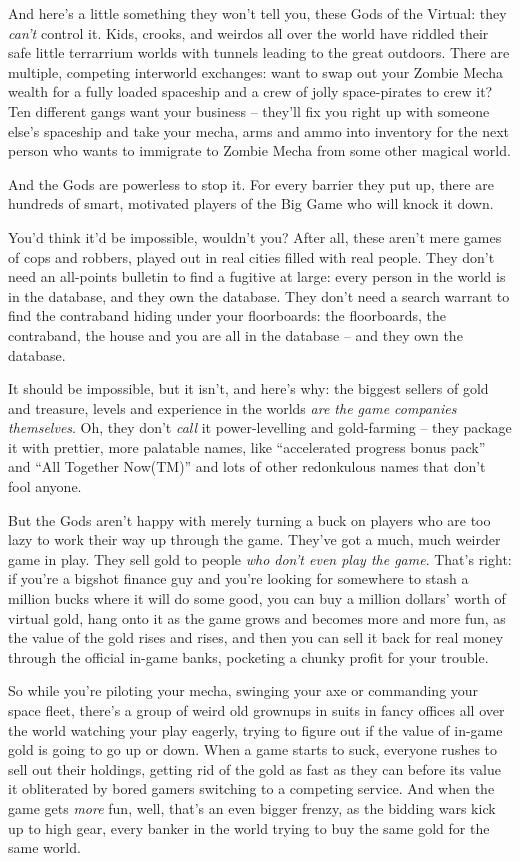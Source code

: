 And here's a little something they won't tell you, these Gods of
the Virtual: they \emph{can't} control it. Kids, crooks, and
weirdos all over the world have riddled their safe little
terrarrium worlds with tunnels leading to the great outdoors. There
are multiple, competing interworld exchanges: want to swap out your
Zombie Mecha wealth for a fully loaded spaceship and a crew of
jolly space-pirates to crew it? Ten different gangs want your
business -- they'll fix you right up with someone else's spaceship
and take your mecha, arms and ammo into inventory for the next
person who wants to immigrate to Zombie Mecha from some other
magical world.

And the Gods are powerless to stop it. For every barrier they put
up, there are hundreds of smart, motivated players of the Big Game
who will knock it down.

You'd think it'd be impossible, wouldn't you? After all, these
aren't mere games of cops and robbers, played out in real cities
filled with real people. They don't need an all-points bulletin to
find a fugitive at large: every person in the world is in the
database, and they own the database. They don't need a search
warrant to find the contraband hiding under your floorboards: the
floorboards, the contraband, the house and you are all in the
database -- and they own the database.

It should be impossible, but it isn't, and here's why: the biggest
sellers of gold and treasure, levels and experience in the worlds
\emph{are the game companies themselves}. Oh, they don't
\emph{call} it power-levelling and gold-farming -- they package it
with prettier, more palatable names, like ``accelerated progress
bonus pack'' and ``All Together Now(TM)'' and lots of other
redonkulous names that don't fool anyone.

But the Gods aren't happy with merely turning a buck on players who
are too lazy to work their way up through the game. They've got a
much, much weirder game in play. They sell gold to people
\emph{who don't even play the game}. That's right: if you're a
bigshot finance guy and you're looking for somewhere to stash a
million bucks where it will do some good, you can buy a million
dollars' worth of virtual gold, hang onto it as the game grows and
becomes more and more fun, as the value of the gold rises and
rises, and then you can sell it back for real money through the
official in-game banks, pocketing a chunky profit for your
trouble.

So while you're piloting your mecha, swinging your axe or
commanding your space fleet, there's a group of weird old grownups
in suits in fancy offices all over the world watching your play
eagerly, trying to figure out if the value of in-game gold is going
to go up or down. When a game starts to suck, everyone rushes to
sell out their holdings, getting rid of the gold as fast as they
can before its value it obliterated by bored gamers switching to a
competing service. And when the game gets \emph{more} fun, well,
that's an even bigger frenzy, as the bidding wars kick up to high
gear, every banker in the world trying to buy the same gold for the
same world.

